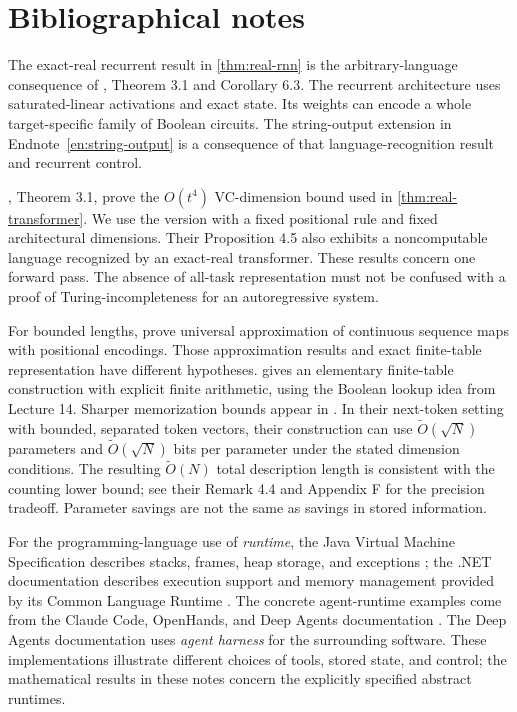\documentclass[11pt,twoside]{article}
\theoremstyle{definition}
\theoremstyle{remark}
\begin{document}
\clearpage
\printendnotes

\section*{Bibliographical notes}

The exact-real recurrent result in \cref{thm:real-rnn} is the arbitrary-language
consequence of \citet{siegelmann1994}, Theorem 3.1 and Corollary 6.3.
The recurrent architecture uses saturated-linear activations and exact
state. Its weights can encode a whole target-specific family of Boolean
circuits. The string-output extension in Endnote~\ref{en:string-output}
is a consequence of that language-recognition result and recurrent control.

, Theorem 3.1, prove the $O(t^4)$ VC-dimension bound used
in \cref{thm:real-transformer}. We use the version with a fixed positional
rule and fixed architectural dimensions. Their Proposition 4.5 also
exhibits a noncomputable language recognized by an exact-real transformer.
These results concern one forward pass. The absence of all-task
representation must not be confused with a proof of Turing-incompleteness
for an autoregressive system.

For bounded lengths, \citet{yun2020} prove universal approximation of
continuous sequence maps with positional encodings. Those approximation
results and exact finite-table representation have different hypotheses.
 gives an elementary finite-table construction with
explicit finite arithmetic, using the Boolean lookup idea from Lecture 14.
Sharper memorization bounds appear in \citet{kajitsuka2025}. In their
next-token setting with bounded, separated token vectors, their construction
can use $\widetilde O(\sqrt N)$ parameters and
$\widetilde O(\sqrt N)$ bits per parameter under the stated dimension
conditions. The resulting $\widetilde O(N)$ total description length is
consistent with the counting lower bound; see their Remark 4.4 and
Appendix F for the precision tradeoff. Parameter savings are not the same
as savings in stored information.

For the programming-language use of \emph{runtime}, the Java Virtual Machine
Specification describes stacks, frames, heap storage, and exceptions
\citep{jvms}; the .NET documentation describes execution support and memory
management provided by its Common Language Runtime \citep{microsoftclr}.
The concrete agent-runtime examples
come from the Claude Code, OpenHands, and Deep Agents documentation
\citep{claudecode,openhandsdocs,deepagentsdocs}. The Deep Agents documentation
uses \emph{agent harness} for the surrounding software. These implementations
illustrate different choices of tools, stored state, and control; the
mathematical results in these notes concern the explicitly specified abstract
runtimes.
\end{document}
